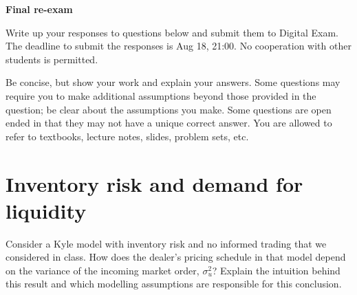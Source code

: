 \documentclass[a4paper]{article}
\newif\ifsolutions
\begin{document}
{\ifsolutions \else	
	
\fi}

\begin{center}
		\LARGE\textbf{Final re-exam {\ifsolutions solutions \fi}}
\end{center}

{\ifsolutions \else	
Write up your responses to questions below and submit them to Digital Exam. The deadline to submit the responses is Aug 18, 21:00. No cooperation with other students is permitted.

Be concise, but show your work and explain your answers. Some questions may require you to make additional assumptions beyond those provided in the question; be clear about the assumptions you make. Some questions are open ended in that they may not have a unique correct answer. You are allowed to refer to textbooks, lecture notes, slides, problem sets, etc.
\fi}






\section{Inventory risk and demand for liquidity}

Consider a Kyle model with inventory risk and no informed trading that we considered in class. How does the dealer's pricing schedule in that model depend on the variance of the incoming market order, $\sigma^2_u$? Explain the intuition behind this result and which modelling assumptions are responsible for this conclusion.


\ifsolutions
\subsection*{Solution}
	The dealer's pricing schedule in the mentioned model does not depend on $\sigma^2_u$ (see slide deck L7, slide 23). This is because the dealer's pricing decisions are guided by the premium they require for holding on to the inventory given the uncertainty in the asset valuation. There is no informed trading that attempts to hide between noise traders' orders. This model further assumes that the dealer maximizes their one-period-ahead wealth, which abstracts away from how the question of how the dealer will unravel their inventory. Finally, the dealers are assumed to be competitive. Therefore, there is no reason for the variance of liquidity demand to affect the pricing offered by the dealer. If, however, any of the aforementioned assumptions were altered, the result would be different.
\fi
\end{document}

